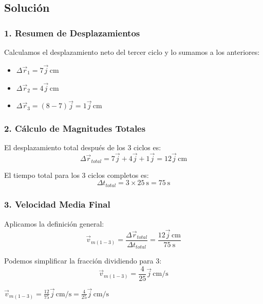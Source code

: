 \documentclass[12pt, a4paper]{article}
\begin{document}
\subsection*{Solución}

\subsubsection*{1. Resumen de Desplazamientos}
Calculamos el desplazamiento neto del tercer ciclo y lo sumamos a los anteriores:
\begin{itemize}
    \item $\Delta \vec{r}_1 = 7\vec{j} \, \si{\centi\metre}$
    \item $\Delta \vec{r}_2 = 4\vec{j} \, \si{\centi\metre}$
    \item $\Delta \vec{r}_3 = (8 - 7)\vec{j} = 1\vec{j} \, \si{\centi\metre}$
\end{itemize}

\subsubsection*{2. Cálculo de Magnitudes Totales}
El desplazamiento total después de los 3 ciclos es:
\begin{equation}
    \Delta \vec{r}_{total} = 7\vec{j} + 4\vec{j} + 1\vec{j} = 12\vec{j} \, \si{\centi\metre}
\end{equation}

El tiempo total para los 3 ciclos completos es:
\begin{equation}
    \Delta t_{total} = 3 \times \SI{25}{\second} = \SI{75}{\second}
\end{equation}

\subsubsection*{3. Velocidad Media Final}
Aplicamos la definición general:
\begin{equation}
    \vec{v}_{m(1-3)} = \frac{\Delta \vec{r}_{total}}{\Delta t_{total}} = \frac{12\vec{j} \, \si{\centi\metre}}{\SI{75}{\second}}
\end{equation}

Podemos simplificar la fracción dividiendo para 3:
\begin{equation}
    \vec{v}_{m(1-3)} = \frac{4}{25}\vec{j} \, \si{\centi\metre/\second}
\end{equation}

\begin{tcolorbox}[colback=green!5!white, colframe=green!50!black, title=Respuesta Final]
\centering \Large $\vec{v}_{m(1-3)} = \frac{12}{75}\vec{j} \, \si{\centi\metre/\second} = \frac{4}{25}\vec{j} \, \si{\centi\metre/\second}$
\end{tcolorbox}
\end{document}
